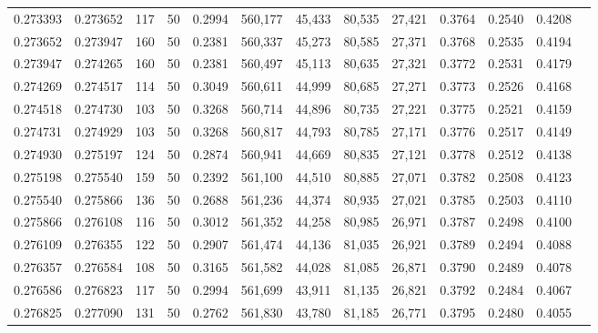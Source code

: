 \begin{tabular}{rrrrrrrrrrrrr}
0.273393 & 0.273652 &   117 &  50 &                                     0.2994 & 560,177 &  45,433 &  80,535 &  27,421 & 0.3764 & 0.2540 & 0.4208 \\
0.273652 & 0.273947 &   160 &  50 &                                     0.2381 & 560,337 &  45,273 &  80,585 &  27,371 & 0.3768 & 0.2535 & 0.4194 \\
0.273947 & 0.274265 &   160 &  50 &                                     0.2381 & 560,497 &  45,113 &  80,635 &  27,321 & 0.3772 & 0.2531 & 0.4179 \\
0.274269 & 0.274517 &   114 &  50 &                                     0.3049 & 560,611 &  44,999 &  80,685 &  27,271 & 0.3773 & 0.2526 & 0.4168 \\
0.274518 & 0.274730 &   103 &  50 &                                     0.3268 & 560,714 &  44,896 &  80,735 &  27,221 & 0.3775 & 0.2521 & 0.4159 \\
0.274731 & 0.274929 &   103 &  50 &                                     0.3268 & 560,817 &  44,793 &  80,785 &  27,171 & 0.3776 & 0.2517 & 0.4149 \\
0.274930 & 0.275197 &   124 &  50 &                                     0.2874 & 560,941 &  44,669 &  80,835 &  27,121 & 0.3778 & 0.2512 & 0.4138 \\
0.275198 & 0.275540 &   159 &  50 &                                     0.2392 & 561,100 &  44,510 &  80,885 &  27,071 & 0.3782 & 0.2508 & 0.4123 \\
0.275540 & 0.275866 &   136 &  50 &                                     0.2688 & 561,236 &  44,374 &  80,935 &  27,021 & 0.3785 & 0.2503 & 0.4110 \\
0.275866 & 0.276108 &   116 &  50 &                                     0.3012 & 561,352 &  44,258 &  80,985 &  26,971 & 0.3787 & 0.2498 & 0.4100 \\
0.276109 & 0.276355 &   122 &  50 &                                     0.2907 & 561,474 &  44,136 &  81,035 &  26,921 & 0.3789 & 0.2494 & 0.4088 \\
0.276357 & 0.276584 &   108 &  50 &                                     0.3165 & 561,582 &  44,028 &  81,085 &  26,871 & 0.3790 & 0.2489 & 0.4078 \\
0.276586 & 0.276823 &   117 &  50 &                                     0.2994 & 561,699 &  43,911 &  81,135 &  26,821 & 0.3792 & 0.2484 & 0.4067 \\
0.276825 & 0.277090 &   131 &  50 &                                     0.2762 & 561,830 &  43,780 &  81,185 &  26,771 & 0.3795 & 0.2480 & 0.4055 \\

\end{tabular}
